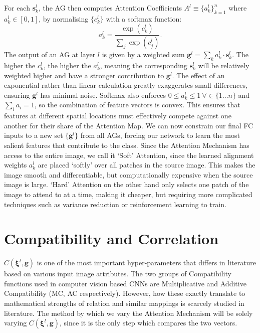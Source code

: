 \documentclass[11pt]{article}
\begin{document}
For each $\bm{s}^{l}_{k}$, the AG then computes Attention Coefficients $A^l \equiv \{a^{l}_{k}\}^{n}_{k=1}$ where $a^{l}_{k} \in [0, 1]$, by normalising $\{c^{l}_{k}\}$ with a softmax function:
\begin{equation}
a^{l}_{k} = \frac{\exp(c^{l}_{k})}{\sum_{j}\exp(c^{l}_{j})}.
\end{equation}
The output of an AG at layer $l$ is given by a weighted sum $\bm{g}^l = \sum_{k}a^{l}_{k} \cdot \bm{s}^{l}_{k}$. The higher the $c^{l}_{k}$, the higher the $a^{l}_{k}$, meaning the corresponding $\bm{s}^{l}_{k}$ will be relatively weighted higher and have a stronger contribution to $\bm{g}^l$. The effect of an exponential rather than linear calculation greatly exaggerates small differences, ensuring $\bm{g}^l$ has minimal noise. Softmax also enforces $0 \leq a^{l}_{k} \leq 1\ \forall \in \{1 \dots n\}$ and $\sum_i a_i = 1$, so the combination of feature vectors is convex. This ensures that features at different spatial locations must effectively compete against one another for their share of the Attention Map. We can now constrain our final FC inputs to a new set $\{\bm{g}^l\}$ from all AGs, forcing our network to learn the most salient features that contribute to the class. Since the Attention Mechanism has access to the entire image, we call it `Soft' Attention, since the learned alignment weights $a^{l}_{k}$ are placed `softly' over all patches in the source image. This makes the image smooth and differentiable, but computationally expensive when the source image is large. `Hard' Attention \cite{luong} on the other hand only selects one patch of the image to attend to at a time, making it cheaper, but requiring more complicated techniques such as variance reduction or reinforcement learning to train. 

\section{Compatibility and Correlation}

$C(\bm{\xi}^{l}, \bm{g})$ is one of the most important hyper-parameters that differs in literature based on various input image attributes. The two groups of Compatibility functions used in computer vision based CNNs are Multiplicative and Additive Compatibility (MC, AC respectively). However, how these exactly translate to mathematical strengths of relation and similar mappings is scarcely studied in literature. The method by which we vary the Attention Mechanism will be solely varying $C(\bm{\xi}^{l}, \bm{g})$, since it is the only step which compares the two vectors.
\end{document}
